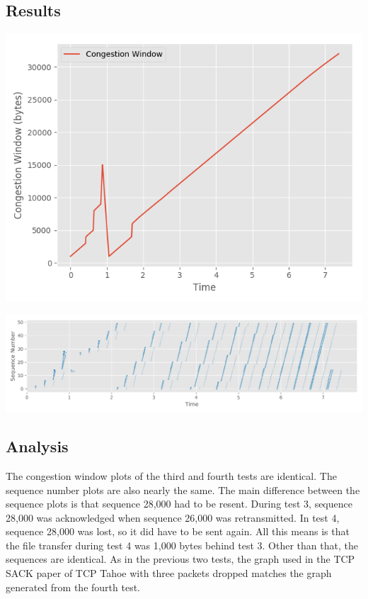 \documentclass[fleqn,11pt]{article}
\begin{document}
	\subsection{Results}
	{
		\centering
	\includegraphics[]{cwnd4}
	
	\includegraphics[width=17cm]{sequence4}
	
	}
	\subsection{Analysis}
	
	The congestion window plots of the third and fourth tests are identical. The sequence number
	plots are also nearly the same. The main difference between the sequence plots is that sequence
	28,000 had to be resent. During test 3, sequence 28,000 was acknowledged when sequence 26,000 was 
	retransmitted. In test 4, sequence 28,000 was lost, so it did have to be sent again. All this means
	is that the file transfer during test 4 was 1,000 bytes behind test 3. Other than that, the sequences are identical. As in the previous two tests, the graph used in the TCP SACK paper of TCP Tahoe with three packets dropped matches the graph generated from the fourth test. 
	
	
\end{document}
